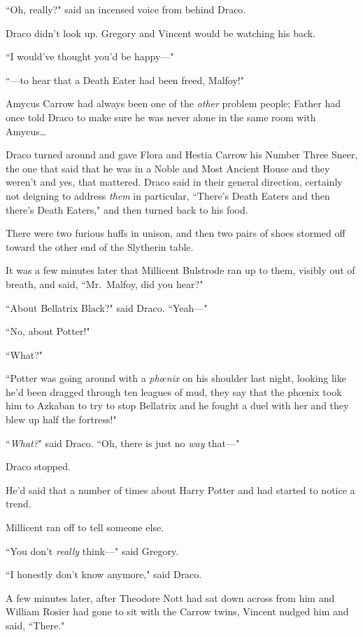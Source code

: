 ``Oh, really?" said an incensed voice from behind Draco.

Draco didn't look up. Gregory and Vincent would be watching his back.

``I would've thought you'd be happy---"

``---to hear that a Death Eater had been freed, Malfoy!"

Amycus Carrow had always been one of the \emph{other} problem people; Father had once told Draco to make sure he was never alone in the same room with Amycus{\ldots}

Draco turned around and gave Flora and Hestia Carrow his Number Three Sneer, the one that said that he was in a Noble and Most Ancient House and they weren't and yes, that mattered. Draco said in their general direction, certainly not deigning to address \emph{them} in particular, ``There's Death Eaters and then there's Death Eaters," and then turned back to his food.

There were two furious huffs in unison, and then two pairs of shoes stormed off toward the other end of the Slytherin table.

It was a few minutes later that Millicent Bulstrode ran up to them, visibly out of breath, and said, ``Mr.~Malfoy, did you hear?"

``About Bellatrix Black?" said Draco. ``Yeah---"

``No, about Potter!"

``What?"

``Potter was going around with a \emph{phœnix} on his shoulder last night, looking like he'd been dragged through ten leagues of mud, they say that the phœnix took him to Azkaban to try to stop Bellatrix and he fought a duel with her and they blew up half the fortress!"

``\emph{What?}" said Draco. ``Oh, there is just no \emph{way} that---"

Draco stopped.

He'd said that a number of times about Harry Potter and had started to notice a trend.

Millicent ran off to tell someone else.

``You don't \emph{really} think---" said Gregory.

``I honestly don't know anymore," said Draco.

A few minutes later, after Theodore Nott had sat down across from him and William Rosier had gone to sit with the Carrow twins, Vincent nudged him and said, ``There."

